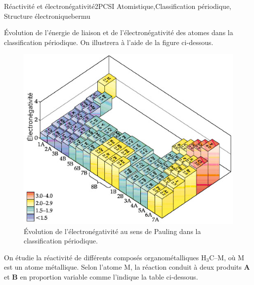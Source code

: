 
\begin{exercise}{Réactivité et électronégativité}{2}{PCSI}
{Atomistique,Classification périodique, Structure électronique}{bermu}

\begin{questions}
    \questioncours \'Evolution de l'énergie de liaison et de l'électronégativité des atomes dans la classification périodique. 
    On illustrera à l'aide de la figure ci-dessous.
    
\begin{EnvUplevel}
    \begin{figure}[H]
        \centering
        \includegraphics[scale=.6]{chimiePC/atomes/electroneg.jpg}
        \caption{\'Evolution de l'électronégativité au sens de Pauling dans la classification périodique.}
        \label{fig:my_label}
    \end{figure}
\end{EnvUplevel}

\begin{EnvUplevel}
On étudie la réactivité de différents composés organométalliques H$_3$C--M, où M est un atome métallique. Selon l'atome M, la réaction conduit à deux produits \textbf{A} et \textbf{B} en proportion variable comme l'indique la table ci-dessous.


\end{EnvUplevel}
\end{questions}
\end{exercise}
